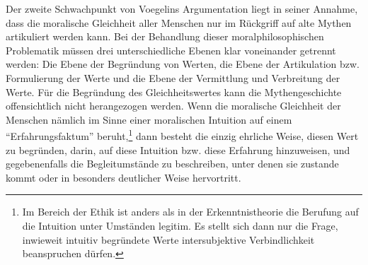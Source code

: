 Der zweite Schwachpunkt von Voegelins Argumentation liegt in seiner Annahme,
dass die moralische Gleichheit aller Menschen nur im Rückgriff auf alte Mythen
artikuliert werden kann. Bei der Behandlung dieser moralphilosophischen
Problematik müssen drei unterschiedliche Ebenen klar voneinander getrennt
werden: Die Ebene der Begründung von Werten, die Ebene der Artikulation bzw.
Formulierung der Werte und die Ebene der Vermittlung und Verbreitung der
Werte. Für die Begründung des Gleichheitswertes kann die Mythengeschichte
offensichtlich nicht herangezogen werden. Wenn die moralische Gleichheit der
Menschen nämlich im Sinne einer moralischen Intuition auf einem
"`Erfahrungsfaktum"' beruht,\footnote{Im Bereich der Ethik ist anders als in
  der Erkenntnistheorie die Berufung auf die Intuition unter Umständen
  legitim. Es stellt sich dann nur die Frage, inwieweit intuitiv begründete
  Werte intersubjektive Verbindlichkeit beanspruchen dürfen.} dann besteht die
einzig ehrliche Weise, diesen Wert zu begründen, darin, auf diese Intuition
bzw.  diese Erfahrung hinzuweisen, und gegebenenfalls die Begleitumstände
 zu beschreiben, unter denen sie zustande kommt oder in besonders
deutlicher Weise hervortritt.

